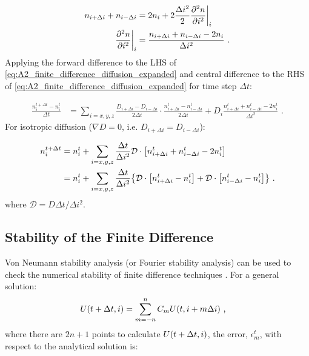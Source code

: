 \begin{equation}
    \begin{aligned}
        n_{i+\Delta i}+n_{i-\Delta i} &=2n_{i} + 2\frac{\Delta i^2}{2}\pdv[2]{n}{i}\bigg|_{i} \\
        \pdv[2]{n}{i} \bigg|_{i}&=\frac{n_{i+\Delta i}+n_{i-\Delta i}-2n_i}{\Delta i^2}\text{ .} 
    \end{aligned}
\end{equation}
\noindent Applying the forward difference to the LHS of \autoref{eq:A2_finite_difference_diffusion_expanded} and central difference to the RHS of \autoref{eq:A2_finite_difference_diffusion_expanded} for time step $\Delta t$:

\begin{equation}
    \begin{aligned}
    \frac{n_i^{t+\Delta t}-n_i^t}{\Delta t}&=\sum_{i=x,y,z}\frac{D_{i+\Delta i}-D_{i-\Delta i}}{2\Delta i}\cdot \frac{n_{i+\Delta i}^t-n_{i-\Delta i}^t}{2\Delta i}+D_i\frac{n_{i+\Delta i}^t+n_{i-\Delta i}^t-2n_i^t}{\Delta i^2}\text{ .} 
    \end{aligned}
\end{equation}
\noindent For isotropic diffusion ($\nabla D=0$, i.e. $D_{i+\Delta i}=D_{i-\Delta i}$):

\begin{equation}
    \begin{aligned}
    n_i^{t+\Delta t}&=n_i^t+\sum_{i=x,y,z}\frac{\Delta t}{\Delta i^2}\mathcal{D}\cdot\qty[n_{i+\Delta i}^t+n_{i-\Delta i}^t-2n_i^t] \\
    &=n_i^t+\sum_{i=x,y,z} \frac{\Delta t}{\Delta i^2}\qty{\mathcal{D}\cdot\qty[n_{i+\Delta i}^t-n_i^t]+\mathcal{D}\cdot\qty[n_{i-\Delta i}^t-n_i^t]}\text{ .} 
    \end{aligned} \label{eq:A2_diffusion_finite_diff}
\end{equation}
\noindent where $\mathcal{D}= D\Delta t/\Delta i^2$. %

\subsection{Stability of the Finite Difference} \label{sec:A2_finite_stability}

Von Neumann stability analysis (or Fourier stability analysis) can be used to check the numerical stability of finite difference techniques \citep{alma9929637001811}. For a general solution:
\begin{equation}
    \begin{aligned}
        U\qty(t+\Delta t, i)&=\sum_{m=-n}^n C_m U\qty(t,i+m\Delta i)\text{ ,} 
    \end{aligned} \label{eq:A3_von_newmann_example}
\end{equation}
\noindent where there are $2n+1$ points to calculate $U\qty(t+\Delta t, i)$, the error, $\epsilon_m^t$, with respect to the analytical solution is:

